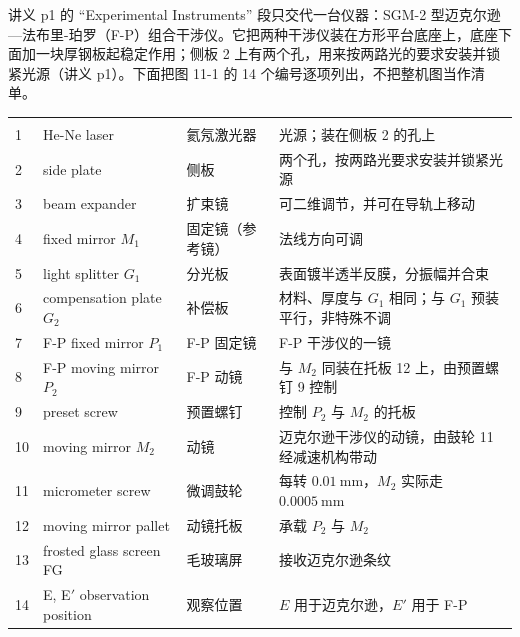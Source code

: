 \documentclass[11pt]{ctexart}
\begin{document}

讲义 p1 的 “Experimental Instruments” 段只交代一台仪器：SGM-2 型迈克尔逊—法布里-珀罗（F-P）组合干涉仪。它把两种干涉仪装在方形平台底座上，底座下面加一块厚钢板起稳定作用；侧板 2 上有两个孔，用来按两路光的要求安装并锁紧光源（讲义 p1）。下面把图 11-1 的 14 个编号逐项列出，不把整机图当作清单。

\begin{center}
\small
\begin{longtable}{@{}C{0.7cm}L{4.6cm}L{4.4cm}L{5.2cm}@{}}
\toprule
{} &  &  & \\
\midrule
\endfirsthead
\toprule
{} &  &  & \\
\midrule
{} & He-Ne laser & 氦氖激光器 & 光源；装在侧板 2 的孔上\\
2 & side plate & 侧板 & 两个孔，按两路光要求安装并锁紧光源\\
3 & beam expander & 扩束镜 & 可二维调节，并可在导轨上移动\\
4 & fixed mirror \(M_1\) & 固定镜（参考镜） & 法线方向可调\\
5 & light splitter \(G_1\) & 分光板 & 表面镀半透半反膜，分振幅并合束\\
6 & compensation plate \(G_2\) & 补偿板 & 材料、厚度与 \(G_1\) 相同；与 \(G_1\) 预装平行，非特殊不调\\
7 & F-P fixed mirror \(P_1\) & F-P 固定镜 & F-P 干涉仪的一镜\\
8 & F-P moving mirror \(P_2\) & F-P 动镜 & 与 \(M_2\) 同装在托板 12 上，由预置螺钉 9 控制\\
9 & preset screw & 预置螺钉 & 控制 \(P_2\) 与 \(M_2\) 的托板\\
10 & moving mirror \(M_2\) & 动镜 & 迈克尔逊干涉仪的动镜，由鼓轮 11 经减速机构带动\\
11 & micrometer screw & 微调鼓轮 & 每转 \(0.01\ \mathrm{mm}\)，\(M_2\) 实际走 \(0.0005\ \mathrm{mm}\)\\
12 & moving mirror pallet & 动镜托板 & 承载 \(P_2\) 与 \(M_2\)\\
13 & frosted glass screen FG & 毛玻璃屏 & 接收迈克尔逊条纹\\
14 & E, E$'$ observation position & 观察位置 & \(E\) 用于迈克尔逊，\(E'\) 用于 F-P\\
\bottomrule
\end{longtable}
\end{center}
\end{document}
